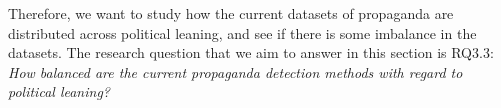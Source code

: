 
Therefore, we want to study how the current datasets of propaganda are distributed across political leaning, and see if there is some imbalance in the datasets. 
%
%
The research question that we aim to answer in this section is RQ3.3: \emph{How balanced are the current propaganda detection methods with regard to political leaning?}










    
